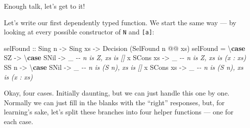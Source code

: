 \documentclass[]{article}
\newenvironment{Shaded}{}{}
\newcommand{\CommentTok}[1]{\textcolor[rgb]{0.38,0.63,0.69}{\textit{#1}}}
\newcommand{\DataTypeTok}[1]{\textcolor[rgb]{0.56,0.13,0.00}{#1}}
\newcommand{\KeywordTok}[1]{\textcolor[rgb]{0.00,0.44,0.13}{\textbf{#1}}}
\newcommand{\NormalTok}[1]{#1}
\newcommand{\OperatorTok}[1]{\textcolor[rgb]{0.40,0.40,0.40}{#1}}
\newcommand{\OtherTok}[1]{\textcolor[rgb]{0.00,0.44,0.13}{#1}}
\begin{document}
Enough talk, let's get to it!

Let's write our first dependently typed function. We start the same way --- by
looking at every possible constructor of \texttt{N} and \texttt{{[}a{]}}:

\begin{Shaded}
\begin{Highlighting}[]
\NormalTok{selFound}
\OtherTok{    ::} \DataTypeTok{Sing}\NormalTok{ n}
    \OtherTok{{-}>} \DataTypeTok{Sing}\NormalTok{ xs}
    \OtherTok{{-}>} \DataTypeTok{Decision}\NormalTok{ (}\DataTypeTok{SelFound}\NormalTok{ n }\OperatorTok{@@}\NormalTok{ xs)}
\NormalTok{selFound }\OtherTok{=}\NormalTok{ \textbackslash{}}\KeywordTok{case}
    \DataTypeTok{SZ} \OtherTok{{-}>}\NormalTok{ \textbackslash{}}\KeywordTok{case}
      \DataTypeTok{SNil}         \OtherTok{{-}>}\NormalTok{ \_   }\CommentTok{{-}{-} n is \textquotesingle{}Z, xs is \textquotesingle{}[]}
\NormalTok{      x }\OtherTok{\textasciigrave{}SCons\textasciigrave{}}\NormalTok{ xs }\OtherTok{{-}>}\NormalTok{ \_   }\CommentTok{{-}{-} n is \textquotesingle{}Z, xs is (x \textquotesingle{}: xs)}
    \DataTypeTok{SS}\NormalTok{ n }\OtherTok{{-}>}\NormalTok{ \textbackslash{}}\KeywordTok{case}
      \DataTypeTok{SNil}         \OtherTok{{-}>}\NormalTok{ \_   }\CommentTok{{-}{-} n is (\textquotesingle{}S n), xs is \textquotesingle{}[]}
\NormalTok{      x }\OtherTok{\textasciigrave{}SCons\textasciigrave{}}\NormalTok{ xs }\OtherTok{{-}>}\NormalTok{ \_   }\CommentTok{{-}{-} n is (\textquotesingle{}S n), xs is (x \textquotesingle{}: xs)}
\end{Highlighting}
\end{Shaded}

Okay, four cases. Initially daunting, but we can just handle this one by one.
Normally we can just fill in the blanks with the ``right'' responses, but, for
learning's sake, let's split these branches into four helper functions --- one
for each case.
\end{document}
